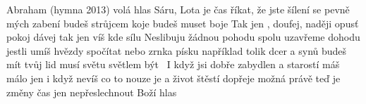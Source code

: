 \begin{TEXT}{Abraham (hymna 2013)}
\SLOKA {} volá  hlas\NL
{} Sáru, Lota  je čas\NL
{} říkat, že jste šílení\NL
{} se pevně mých zabení\NL
{} budeš strůjcem koje\NL
{} budeš muset  boje
\REFREN  Tak jen , doufej, naději \NL
{} opus\v{t} pokoj dávej\NL
tak jen  víš kde sílu 
\SLOKA Neslibuju žádnou pohodu\NL
spolu uzavřeme dohodu\NL
jestli umíš hvězdy spočítat\NL
nebo zrnka písku například\NL
tolik dcer a synů budeš mít\NL
tvůj lid musí světu světlem být
\REFRENHRAJ \,
\SLOKA I když jsi dobře zabydlen\NL
a starostí máš málo jen\NL
i když nevíš co to nouze je\NL
a život štěstí dopřeje\NL
možná právě te\v{d} je změny čas\NL
jen nepřeslechnout Boží hlas
\REFRENHRAJ \,
\end{TEXT}
